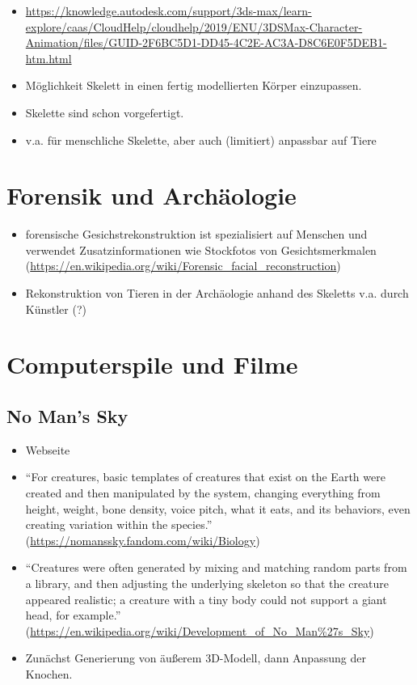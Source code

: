 \begin{itemize}
 \item \url{https://knowledge.autodesk.com/support/3ds-max/learn-explore/caas/CloudHelp/cloudhelp/2019/ENU/3DSMax-Character-Animation/files/GUID-2F6BC5D1-DD45-4C2E-AC3A-D8C6E0F5DEB1-htm.html}
 \item Möglichkeit Skelett in einen fertig modellierten Körper einzupassen. 
 \item Skelette sind schon vorgefertigt.
 \item v.a. für menschliche Skelette, aber auch (limitiert) anpassbar auf Tiere
\end{itemize}


\section{Forensik und Archäologie}

\begin{itemize}
 \item forensische Gesichstrekonstruktion ist spezialisiert auf Menschen und verwendet Zusatzinformationen wie Stockfotos von Gesichtsmerkmalen (\url{https://en.wikipedia.org/wiki/Forensic_facial_reconstruction})
 \item Rekonstruktion von Tieren in der Archäologie anhand des Skeletts v.a. durch Künstler (?)
\end{itemize}

\section{Computerspile und Filme}

\subsection{No Man's Sky}

\begin{itemize}
 \item Webseite \cite{NoMansSky}
 \item "`For creatures, basic templates of creatures that exist on the Earth were created and then manipulated by the system, changing everything from height, weight, bone density, voice pitch, what it eats, and its behaviors, even creating variation within the species."' (\url{https://nomanssky.fandom.com/wiki/Biology})
 \item "`Creatures were often generated by mixing and matching random parts from a library, and then adjusting the underlying skeleton so that the creature appeared realistic; a creature with a tiny body could not support a giant head, for example."' (\url{https://en.wikipedia.org/wiki/Development_of_No_Man\%27s_Sky})
 \item Zunächst Generierung von äußerem 3D-Modell, dann Anpassung der Knochen.
\end{itemize}

